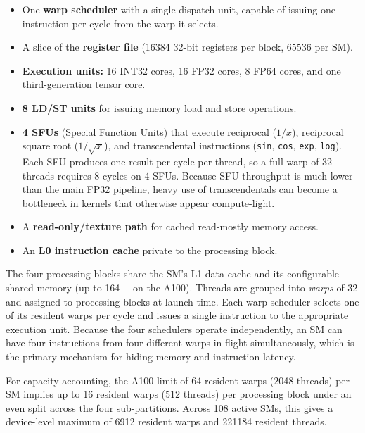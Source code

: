 \begin{itemize}
  \item One \textbf{warp scheduler} with a single dispatch unit, capable of 
    issuing one instruction per cycle from the warp it selects.
  \item A slice of the \textbf{register file} (\num{16384} 32-bit registers 
    per block, \num{65536} per SM).
  \item \textbf{Execution units:} 16 INT32 cores, 16 FP32 cores, 8 FP64 
    cores, and one third-generation tensor core.
  \item \textbf{8 LD/ST units} for issuing memory load and store operations.
  \item \textbf{4 SFUs} (Special Function Units) that execute reciprocal
    ($1/x$), reciprocal square root ($1/\sqrt{x}$), and transcendental
    instructions (\texttt{sin}, \texttt{cos}, \texttt{exp}, \texttt{log}).
    Each SFU produces one result per cycle per thread, so a full warp of 32
    threads requires 8 cycles on 4 SFUs. Because SFU throughput is much
    lower than the main FP32 pipeline, heavy use of transcendentals can
    become a bottleneck in kernels that otherwise appear compute-light.
  \item A \textbf{read-only/texture path} for cached read-mostly memory access.
  \item An \textbf{L0 instruction cache} private to the processing block.
\end{itemize}

The four processing blocks share the SM's L1 data cache and its configurable 
shared memory (up to \SI{164}{\kilo\byte} on the A100). Threads are grouped into 
\emph{warps} of 32 and assigned to processing blocks at launch time. Each warp 
scheduler selects one of its resident warps per cycle and issues a single 
instruction to the appropriate execution unit. Because the four schedulers operate 
independently, an SM can have four instructions from four different warps in flight 
simultaneously, which is the primary mechanism for hiding memory and instruction 
latency.

For capacity accounting, the A100 limit of \num{64} resident warps
(\num{2048} threads) per SM implies up to \num{16} resident warps
(\num{512} threads) per processing block under an even split across the four
sub-partitions. Across \num{108} active SMs, this gives a device-level maximum
of \num{6912} resident warps and \num{221184} resident threads.

